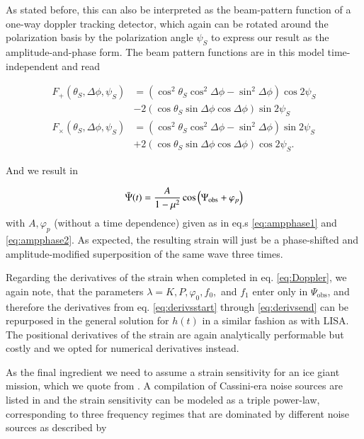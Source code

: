 \documentclass{aa}
\begin{document}
As stated before, this can also be interpreted as the beam-pattern function of a one-way doppler tracking detector, which again can be rotated around the polarization basis by the polarization angle $\psi_S$ to express our result as  the amplitude-and-phase form. The beam pattern functions are in this model time-independent and read

\begin{equation}
\begin{split}
    F_+(\theta_S,\Delta \phi,\psi_S) &= (\cos^2 \theta_S \cos^2 \Delta \phi-\sin^2 \Delta \phi)\cos 2\psi_S \\
    &-2(\cos \theta_S \sin \Delta \phi \cos \Delta \phi)\sin 2\psi_S \\
    F_\times(\theta_S,\Delta \phi,\psi_S) &= (\cos^2 \theta_S \cos^2 \Delta \phi-\sin^2 \Delta \phi)\sin 2\psi_S \\
    &+2(\cos \theta_S \sin \Delta \phi \cos \Delta \phi)\cos 2\psi_S.
\end{split}
\end{equation}

And we result in

\begin{equation}
    \Bar{\Psi}(t) = \frac{A}{1-\mu^2} \cos \left(\Psi_\mathrm{obs} + \varphi_p \right)
\end{equation}
with $A, \varphi_p$ (without a time dependence) given as in eq.s \ref{eq:ampphase1} and \ref{eq:ampphase2}. As expected, the resulting strain will just be a phase-shifted and amplitude-modified superposition of the same wave three times.

Regarding the derivatives of the strain when completed in eq. \ref{eq:Doppler}, we again note, that the parameters $\lambda=K,P,\varphi_0,f_0,$ and $f_1$ enter only in $\Psi_\mathrm{obs}$, and therefore the derivatives from eq. \ref{eq:derivsstart} through \ref{eq:derivsend} can be repurposed in the general solution for $h(t)$ in a similar fashion as with LISA. The positional derivatives of the strain are again analytically performable but costly and we opted for numerical derivatives instead.

As the final ingredient we need to assume a strain sensitivity for an ice giant mission, which we quote from \citep{soyuer2021}. A compilation of Cassini-era noise sources are listed in \citep{armstrong} and the strain sensitivity can be modeled as a triple power-law, corresponding to three frequency regimes that are dominated by different noise sources as described by \citep{godtierpaper}
\end{document}
